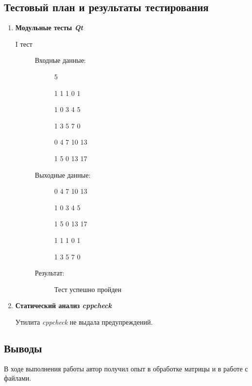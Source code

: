 \documentclass[12pt,a4paper]{report}
\begin{document}
\subsection{Тестовый план и результаты тестирования}
\hspace{\parindent}
\begin{enumerate}
\item \textbf{Модульные тесты \textit{Qt}}

\begin{description}
\item[I тест]
\hspace{\parindent}
\begin{flushleft}
\begin{description}
\item[Входные данные:]

\hspace{\parindent}
\begin{flushleft}
5

1 1 1 0 1

1 0 3 4 5

1 3 5 7 0

0 4 7 10 13

1 5 0 13 17
\end{flushleft}

\item[Выходные данные:]
\hspace{\parindent}
\begin{flushleft}
0 4 7 10 13

1 0 3 4 5

1 5 0 13 17

1 1 1 0 1

1 3 5 7 0
\end{flushleft}
\item[Результат:] Тест успешно пройден
\end{description}
\end{flushleft}
\end{description}

\item \textbf{Статический анализ \textit{cppcheck}}

Утилита \textit{cppcheck} не выдала предупреждений.
\end{enumerate}
\subsection{Выводы}
\hspace{\parindent}
В ходе выполнения работы автор получил опыт в обработке матрицы и в работе с файлами.
\end{document}
